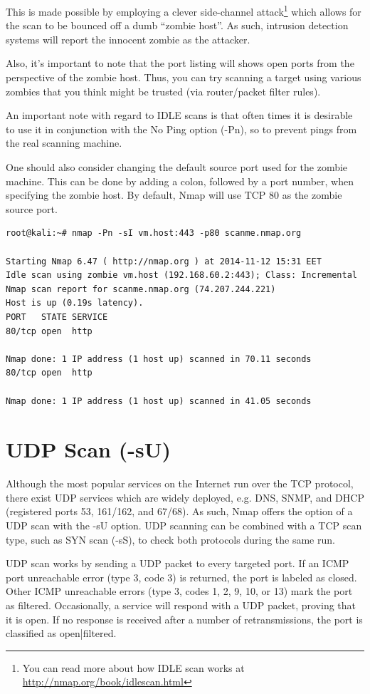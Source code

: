 \documentclass[a4paper,oneside,12pt]{book}
\begin{document}
This is made possible by employing a clever side-channel attack\footnote{You can read more about how IDLE scan works at \url{http://nmap.org/book/idlescan.html}} which allows for the scan to be bounced off a dumb ``zombie host''. As such, intrusion detection systems will report the innocent zombie as the attacker.

Also, it's important to note that the port listing will shows open ports from the perspective of the zombie host. Thus, you can try scanning a target using various zombies that you think might be trusted (via router/packet filter rules).

An important note with regard to IDLE scans is that often times it is desirable to use it in conjunction with the No Ping option (-Pn), so to prevent pings from the real scanning machine.

One should also consider changing the default source port used for the zombie machine. This can be done by adding a colon, followed by a port number, when specifying the zombie host. By default, Nmap will use TCP 80 as the zombie source port.

\begin{lstlisting}[title=A sample Nmap scan using the IDLE Scan option]
root@kali:~# nmap -Pn -sI vm.host:443 -p80 scanme.nmap.org

Starting Nmap 6.47 ( http://nmap.org ) at 2014-11-12 15:31 EET
Idle scan using zombie vm.host (192.168.60.2:443); Class: Incremental
Nmap scan report for scanme.nmap.org (74.207.244.221)
Host is up (0.19s latency).
PORT   STATE SERVICE
80/tcp open  http

Nmap done: 1 IP address (1 host up) scanned in 70.11 seconds
80/tcp open  http

Nmap done: 1 IP address (1 host up) scanned in 41.05 seconds
\end{lstlisting}

\section{UDP Scan (-sU)}

Although the most popular services on the Internet run over the TCP protocol, there exist UDP services which are widely deployed, e.g. DNS, SNMP, and DHCP (registered ports 53, 161/162, and 67/68). As such, Nmap offers the option of a UDP scan with the -sU option. UDP scanning can be combined with a TCP scan type, such as SYN scan (-sS), to check both protocols during the same run.

UDP scan works by sending a UDP packet to every targeted port. If an ICMP port unreachable error (type 3, code 3) is returned, the port is labeled as closed. Other ICMP unreachable errors (type 3, codes 1, 2, 9, 10, or 13) mark the port as filtered. Occasionally, a service will respond with a UDP packet, proving that it is open. If no response is received after a number of retransmissions, the port is classified as open|filtered.
\end{document}
